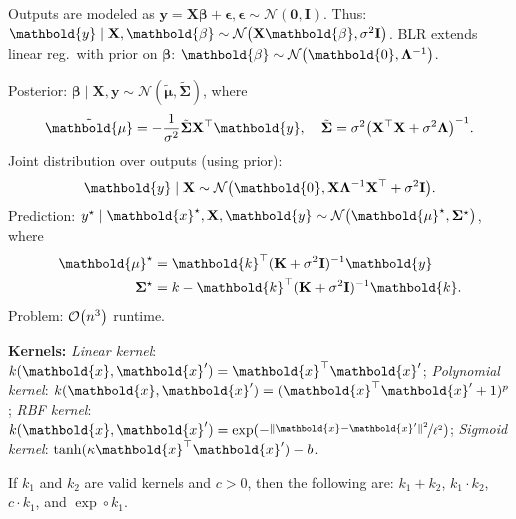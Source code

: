 \documentclass[9pt]{extarticle}
\newenvironment{topic}[1]
{\textbf{\sffamily \colorbox{black}{\rlap{\textbf{\textcolor{white}{#1}}}\hspace{\linewidth}\hspace{-2\fboxsep}}}}
{}
\newenvironment{subtopic}[1]
{\textbf{\sffamily #1:}}
{}
\renewcommand{\mat}[1]{\ensuremath{\mathbf{#1}}}
\renewcommand{\vec}[1]{\ensuremath{\mathbold{#1}}}
\begin{document}
\begin{multicols*}{3}
\begin{topic}{Causality}
    \end{topic}

    \begin{topic}{Gaussian processes}
        Outputs are modeled as $\vec{y} = \mat{X} \vec{\beta} + \vec{\epsilon}, \vec{\epsilon} \sim
            \mathcal{N}(\vec{0}, \mat{I})$. Thus: $\vec{y} \mid \mat{X}, \vec{\beta} \sim
            \mathcal{N}\lft(\mat{X} \vec{\beta}, \sigma^2 \mat{I}\rgt)$. BLR extends linear reg.\ with prior on
        $\vec{\beta}$: $\vec{\beta} \sim \mathcal{N}\lft(\vec{0}, \inv{\mat{\Lambda}}\rgt)$.

        Posterior: $\vec{\beta} \mid \mat{X}, \vec{y} \sim \mathcal{N}(\tilde{\vec{\mu}},
            \tilde{\mat{\Sigma}})$, where \[
            \tilde{\vec{\mu}} = -\frac{1}{\sigma^2} \tilde{\mat{\Sigma}} \transpose{\mat{X}} \vec{y}, \quad \tilde{\mat{\Sigma}} = \sigma^2 \inv{\lft( \transpose{\mat{X}} \mat{X} + \sigma^2 \mat{\Lambda} \rgt)}.
        \]
        Joint distribution over outputs (using prior): \[
            \vec{y} \mid \mat{X} \sim \mathcal{N}\lft(\vec{0}, \mat{X}\inv{\mat{\Lambda}} \transpose{\mat{X}} + \sigma^2 \mat{I}\rgt).
        \]
        Prediction: $y^\star \mid \vec{x}^\star, \mat{X}, \vec{y} \sim \mathcal{N} \lft( \vec{\mu}^\star,
            \mat{\Sigma}^\star \rgt)$, where
        \begin{align*}
            \vec{\mu}^\star    & = \transpose{\vec{k}} \inv{(\mat{K} + \sigma^2 \mat{I})} \vec{y}      \\
            \mat{\Sigma}^\star & = k - \transpose{\vec{k}} \inv{(\mat{K} + \sigma^2 \mat{I})} \vec{k}.
        \end{align*}
        Problem: $\bigo{n^3}$ runtime.

        \begin{subtopic}{Kernels}
            \textit{Linear kernel}: $k(\vec{x}, \vec{x}') = \transpose{\vec{x}} \vec{x}'$;
            \textit{Polynomial kernel}: $k(\vec{x}, \vec{x}') = ( \transpose{\vec{x}} \vec{x}' + 1 )^p$;
            \textit{RBF kernel}: $k(\vec{x},\vec{x}') = \exp ( -\nicefrac{\| \vec{x} - \vec{x}' \|^2}{\ell^2})$;
            \textit{Sigmoid kernel}: $\tanh(\kappa \transpose{\vec{x}} \vec{x}') - b$.

            If $k_1$ and $k_2$ are valid kernels and $c > 0$, then the following are: $k_1 + k_2$, $k_1 \cdot
                k_2$, $c \cdot k_1$, and $\exp \circ k_1$.

        \end{subtopic}


\end{topic}
\end{multicols*}
\end{document}
